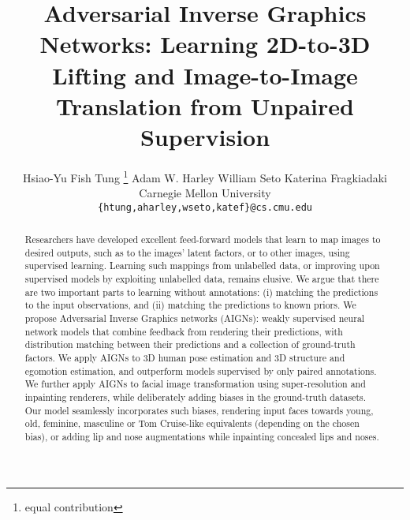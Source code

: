 \documentclass[10pt,twocolumn,letterpaper]{article}
\newcommand*\samethanks[1][\value{footnote}]{\footnotemark[#1]}
\begin{document}
\begin{bibunit}[ieee]
\title{Adversarial Inverse Graphics Networks: Learning 2D-to-3D Lifting and Image-to-Image Translation from Unpaired Supervision}

\author{Hsiao-Yu Fish Tung \thanks{equal contribution} 
\qquad
Adam W. Harley \samethanks[1] 
\qquad
William Seto \samethanks[1] 
\qquad
Katerina Fragkiadaki
\\
Carnegie Mellon University \\
{\tt\small \{htung,aharley,wseto,katef\}@cs.cmu.edu}
}

\maketitle


\begin{abstract}


Researchers have developed excellent feed-forward models that learn to map images to desired outputs, such as to the images' latent factors, or to other images, using supervised learning. Learning such mappings from unlabelled data, or improving upon supervised models by exploiting unlabelled data, remains elusive. We argue that there are two important parts to learning without annotations: 
(i) matching the predictions to the input observations, and (ii) matching the predictions to known priors.
We propose Adversarial Inverse Graphics networks (AIGNs): weakly supervised neural network models that combine feedback from rendering their predictions, with distribution matching between their predictions and a collection of ground-truth factors. We apply AIGNs to 3D human pose estimation and 3D structure and egomotion estimation, and outperform  models supervised by only paired annotations. We further apply AIGNs to facial image transformation using super-resolution and inpainting renderers, while deliberately adding biases in the ground-truth datasets. Our model seamlessly incorporates such biases, rendering input faces towards young, old, feminine, masculine or Tom Cruise-like equivalents (depending on the chosen bias), or adding lip and nose augmentations while inpainting concealed lips and noses.



\end{abstract}
\end{bibunit}
\end{document}
